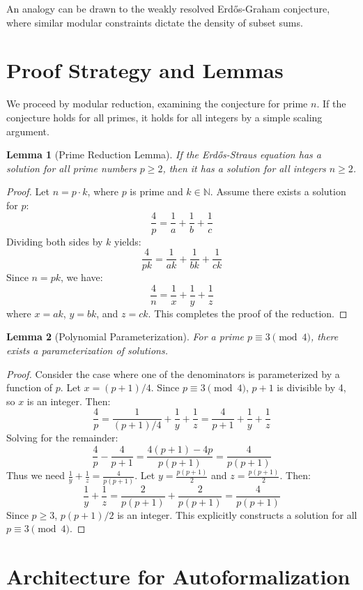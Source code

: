 \documentclass[12pt,a4paper]{article}
\newtheorem{lemma}{Lemma}
\begin{document}
An analogy can be drawn to the weakly resolved Erd\H{o}s-Graham conjecture, where similar modular constraints dictate the density of subset sums.

\section{Proof Strategy and Lemmas}

We proceed by modular reduction, examining the conjecture for prime $n$. If the conjecture holds for all primes, it holds for all integers by a simple scaling argument.

\begin{lemma}[Prime Reduction Lemma]
If the Erd\H{o}s-Straus equation has a solution for all prime numbers $p \geq 2$, then it has a solution for all integers $n \geq 2$.
\end{lemma}
\begin{proof}
Let $n = p \cdot k$, where $p$ is prime and $k \in \mathbb{N}$. Assume there exists a solution for $p$:
$$ \frac{4}{p} = \frac{1}{a} + \frac{1}{b} + \frac{1}{c} $$
Dividing both sides by $k$ yields:
$$ \frac{4}{pk} = \frac{1}{ak} + \frac{1}{bk} + \frac{1}{ck} $$
Since $n = pk$, we have:
$$ \frac{4}{n} = \frac{1}{x} + \frac{1}{y} + \frac{1}{z} $$
where $x=ak$, $y=bk$, and $z=ck$. This completes the proof of the reduction.
\end{proof}

\begin{lemma}[Polynomial Parameterization]
For a prime $p \equiv 3 \pmod 4$, there exists a parameterization of solutions.
\end{lemma}
\begin{proof}
Consider the case where one of the denominators is parameterized by a function of $p$. Let $x = (p+1)/4$. Since $p \equiv 3 \pmod 4$, $p+1$ is divisible by 4, so $x$ is an integer. Then:
$$ \frac{4}{p} = \frac{1}{(p+1)/4} + \frac{1}{y} + \frac{1}{z} = \frac{4}{p+1} + \frac{1}{y} + \frac{1}{z} $$
Solving for the remainder:
$$ \frac{4}{p} - \frac{4}{p+1} = \frac{4(p+1) - 4p}{p(p+1)} = \frac{4}{p(p+1)} $$
Thus we need $\frac{1}{y} + \frac{1}{z} = \frac{4}{p(p+1)}$.
Let $y = \frac{p(p+1)}{2}$ and $z = \frac{p(p+1)}{2}$. Then:
$$ \frac{1}{y} + \frac{1}{z} = \frac{2}{p(p+1)} + \frac{2}{p(p+1)} = \frac{4}{p(p+1)} $$
Since $p \geq 3$, $p(p+1)/2$ is an integer. This explicitly constructs a solution for all $p \equiv 3 \pmod 4$.
\end{proof}

\section{Architecture for Autoformalization}
\end{document}
